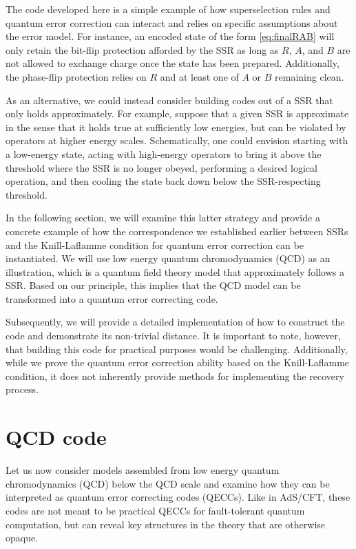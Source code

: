 \documentclass[11pt,english]{article}
\begin{document}
The code developed here is a simple  example of how superselection rules and quantum error correction can interact and relies on specific assumptions about the error model.
For instance, an encoded state of the form \eqref{eq:finalRAB} will only retain the bit-flip protection afforded by the SSR as long as $R$, $A$, and $B$ are not allowed to exchange charge once the state has been prepared.
Additionally, the phase-flip protection relies on $R$ and at least one of $A$ or $B$ remaining clean.

As an alternative, we could instead consider building codes out of a SSR that only holds approximately.
For example, suppose that a given SSR is approximate in the sense that it holds true at sufficiently low energies, but can be violated by operators at higher energy scales.
Schematically, one could envision starting with a low-energy state, acting with high-energy operators to bring it above the threshold where the SSR is no longer obeyed, performing a desired logical operation, and then cooling the state back down below the SSR-respecting threshold.

In the following section, we will examine this latter strategy and provide a concrete example of how the correspondence we established earlier between SSRs and the Knill-Laflamme condition for quantum error correction can be instantiated. We will use low energy quantum chromodynamics (QCD) as an illustration, which is a quantum field theory model that approximately follows a SSR. Based on our principle, this implies that the QCD model can be transformed into a quantum error correcting code. 

Subsequently, we will provide a detailed implementation of how to construct the code and demonstrate its non-trivial distance.  It is important to note, however, that building this code for practical purposes would be challenging. Additionally, while we prove the quantum error correction ability based on the Knill-Laflamme condition, it does not inherently provide methods for implementing the recovery process.



\section{QCD code}
\label{sec:QCD}

Let us now consider models assembled from low energy quantum chromodynamics (QCD) below the QCD scale and examine how they can be interpreted as quantum error correcting codes (QECCs).
Like in AdS/CFT, these codes are not meant to be practical QECCs for fault-tolerant quantum computation, but can reveal key structures in the theory that are otherwise opaque.
\end{document}
